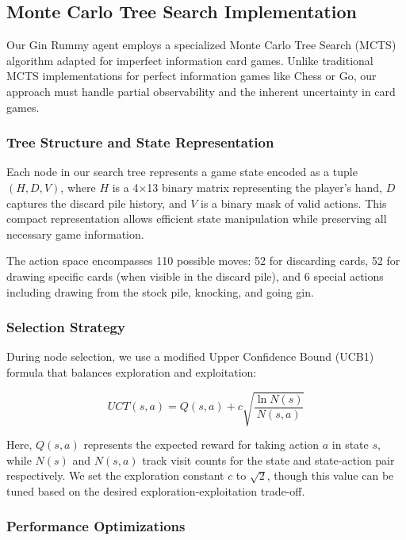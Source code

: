 
\subsection{Monte Carlo Tree Search Implementation}

Our Gin Rummy agent employs a specialized Monte Carlo Tree Search (MCTS) algorithm adapted for imperfect information card games. Unlike traditional MCTS implementations for perfect information games like Chess or Go, our approach must handle partial observability and the inherent uncertainty in card games.

\subsubsection{Tree Structure and State Representation}

Each node in our search tree represents a game state encoded as a tuple $(H, D, V)$, where $H$ is a 4×13 binary matrix representing the player's hand, $D$ captures the discard pile history, and $V$ is a binary mask of valid actions. This compact representation allows efficient state manipulation while preserving all necessary game information.

The action space encompasses 110 possible moves: 52 for discarding cards, 52 for drawing specific cards (when visible in the discard pile), and 6 special actions including drawing from the stock pile, knocking, and going gin.

\subsubsection{Selection Strategy}

During node selection, we use a modified Upper Confidence Bound (UCB1) formula that balances exploration and exploitation:

\[
UCT(s,a) = Q(s,a) + c\sqrt{\frac{\ln N(s)}{N(s,a)}}
\]

Here, $Q(s,a)$ represents the expected reward for taking action $a$ in state $s$, while $N(s)$ and $N(s,a)$ track visit counts for the state and state-action pair respectively. We set the exploration constant $c$ to $\sqrt{2}$, though this value can be tuned based on the desired exploration-exploitation trade-off.

\subsubsection{Performance Optimizations}

